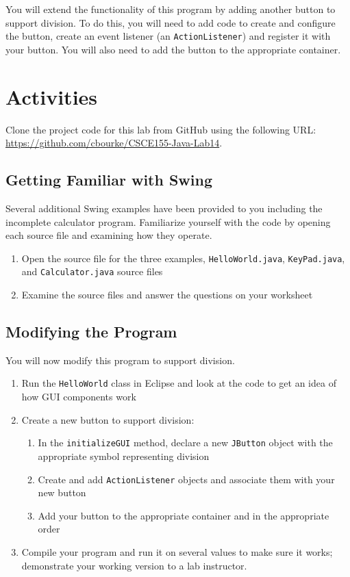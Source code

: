 \documentclass[12pt]{scrartcl}
\begin{document}
You will extend the functionality of this program by adding another button 
to support division.  To do this, you will need to add code to create and 
configure the button, create an event listener (an \texttt{ActionListener}) 
and register it with your button.  You will also need to add the button to 
the appropriate container.

\section{Activities}

Clone the project code for this lab from GitHub using the following
URL: \url{https://github.com/cbourke/CSCE155-Java-Lab14}.

\subsection{Getting Familiar with Swing}

Several additional Swing examples have been provided to you 
including the incomplete calculator program.  Familiarize yourself 
with the code by opening each source file and examining how they 
operate.
\begin{enumerate}
  \item Open the source file for the three examples, \texttt{HelloWorld.java}, 
 	 \texttt{KeyPad.java}, and \texttt{Calculator.java} source files
  \item Examine the source files and answer the questions on your worksheet 
\end{enumerate}
	 
\subsection{Modifying the Program}

You will now modify this program to support division.

\begin{enumerate}
  \item Run the \texttt{HelloWorld} class in Eclipse and 
  	look at the code to get an idea of how GUI components work
  \item Create a new button to support division:
  \begin{enumerate}
    \item In the \texttt{initializeGUI} method, declare a 
    	new \texttt{JButton} object with the appropriate symbol 
	representing division
    \item Create and add \texttt{ActionListener} objects and 
	associate them with your new button
    \item Add your button to the appropriate container and in the appropriate 
	order
  \end{enumerate}
  \item Compile your program and run it on several values to make sure it works; 
  demonstrate your working version to a lab instructor.
\end{enumerate}
\end{document}
